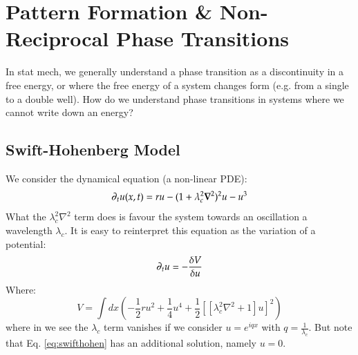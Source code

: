 \section{Pattern Formation \& Non-Reciprocal Phase Transitions}

In stat mech, we generally understand a phase transition as a discontinuity in a free energy, or where the free energy of a system changes form (e.g. from a single to a double well). How do we understand phase transitions in systems where we cannot write down an energy?

\subsection{Swift-Hohenberg Model}
We consider the dynamical equation (a non-linear PDE):
\begin{equation}\label{eq:swifthohen}
    \p_t u(x, t) = ru - (1 + \lambda_c^2\nabla^2)^2u - u^3
\end{equation}
What the $\lambda_c^2 \nabla^2$ term does is favour the system towards an oscillation a wavelength $\lambda_c$. It is easy to reinterpret this equation as the variation of a potential:
\begin{equation}
    \partial_t u = -\frac{\delta V}{\delta u}
\end{equation}
Where:
\begin{equation}
    V = \int dx \left(-\frac{1}{2}ru^2 + \frac{1}{4}u^4 + \frac{1}{2}\left[[\lambda_c^2 \nabla^2 + 1]u\right]^2\right)
\end{equation}
where in we see the $\lambda_c$ term vanishes if we consider $u = e^{iqx}$ with $q = \frac{1}{\lambda_c}$. But note that Eq. \eqref{eq:swifthohen} has an additional solution, namely $u = 0$.

